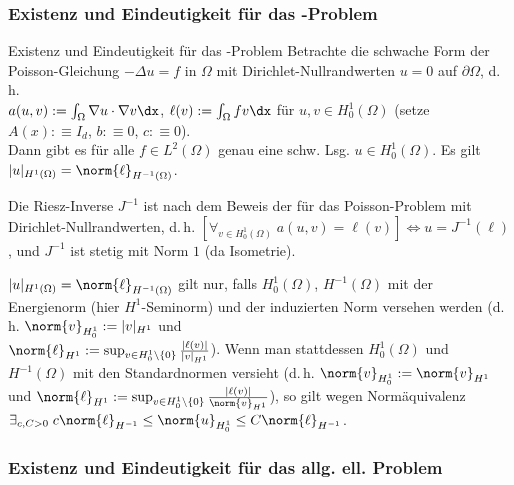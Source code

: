 \pagebreak

\subsubsection{%
    Existenz und Eindeutigkeit für das -Problem%
}

\begin{Satz}{Existenz und Eindeutigkeit für das -Problem}
    Betrachte die schwache Form der Poisson-Gleichung $-\Delta u = f$ in $\Omega$
    mit Dirichlet-Nullrandwerten $u = 0$ auf $\partial\Omega$, d.\,h.\\
    $a(u, v) := \int_\Omega \nabla u \cdot \nabla v \dx$,
    $\ell(v) := \int_\Omega fv \dx$ für $u, v \in H^1_0(\Omega)$
    (setze $A(x) :\equiv I_d$, $b :\equiv 0$, $c :\equiv 0$).\\
    Dann gibt es für alle $f \in L^2(\Omega)$ genau eine schw. Lsg. $u \in H^1_0(\Omega)$.
    Es gilt $|u|_{H^1(\Omega)} = \norm{\ell}_{H^{-1}(\Omega)}$.
\end{Satz}

\begin{Bem}
    Die Riesz-Inverse $J^{-1}$ ist nach dem Beweis
    der  für das Poisson-Problem
    mit Dirichlet-Nullrandwerten, d.\,h.
    $[\forall_{v \in H^1_0(\Omega)}\; a(u, v) = \ell(v)] \iff u = J^{-1}(\ell)$, und
    $J^{-1}$ ist stetig mit Norm $1$ (da Isometrie).
\end{Bem}

\begin{Bem}
    $|u|_{H^1(\Omega)} = \norm{\ell}_{H^{-1}(\Omega)}$ gilt nur, falls
    $H^1_0(\Omega)$, $H^{-1}(\Omega)$ mit der Energienorm (hier $H^1$-Seminorm)
    und der induzierten Norm versehen werden
    (d.\,h. $\norm{v}_{H^1_0} := |v|_{H^1}$ und\\
    $\norm{\ell}_{H^1} := \sup_{v \in H^1_0 \setminus \{0\}}
    \frac{|\ell(v)|}{|v|_{H^1}}$).
    Wenn man stattdessen $H^1_0(\Omega)$ und $H^{-1}(\Omega)$ mit den Standardnormen versieht
    (d.\,h. $\norm{v}_{H^1_0} := \norm{v}_{H^1}$ und
    $\norm{\ell}_{H^1} := \sup_{v \in H^1_0 \setminus \{0\}}
    \frac{|\ell(v)|}{\norm{v}_{H^1}}$),
    so gilt wegen Normäquivalenz
    $\exists_{c, C > 0}\; c \norm{\ell}_{H^{-1}} \le \norm{u}_{H^1_0} \le C \norm{\ell}_{H^{-1}}$.
\end{Bem}

\subsubsection{%
    Existenz und Eindeutigkeit für das allg. ell. Problem%
}

